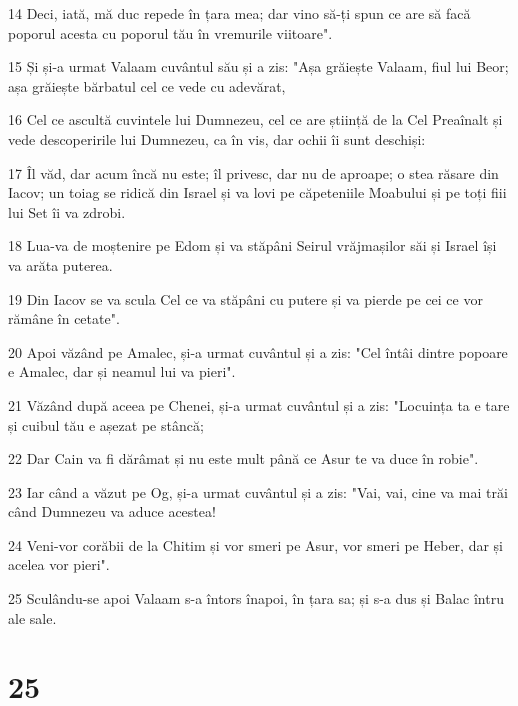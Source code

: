 \par 14 Deci, iată, mă duc repede în țara mea; dar vino să-ți spun ce are să facă poporul acesta cu poporul tău în vremurile viitoare".
\par 15 Și și-a urmat Valaam cuvântul său și a zis: "Așa grăiește Valaam, fiul lui Beor; așa grăiește bărbatul cel ce vede cu adevărat,
\par 16 Cel ce ascultă cuvintele lui Dumnezeu, cel ce are știință de la Cel Preaînalt și vede descoperirile lui Dumnezeu, ca în vis, dar ochii îi sunt deschiși:
\par 17 Îl văd, dar acum încă nu este; îl privesc, dar nu de aproape; o stea răsare din Iacov; un toiag se ridică din Israel și va lovi pe căpeteniile Moabului și pe toți fiii lui Set îi va zdrobi.
\par 18 Lua-va de moștenire pe Edom și va stăpâni Seirul vrăjmașilor săi și Israel își va arăta puterea.
\par 19 Din Iacov se va scula Cel ce va stăpâni cu putere și va pierde pe cei ce vor rămâne în cetate".
\par 20 Apoi văzând pe Amalec, și-a urmat cuvântul și a zis: "Cel întâi dintre popoare e Amalec, dar și neamul lui va pieri".
\par 21 Văzând după aceea pe Chenei, și-a urmat cuvântul și a zis: "Locuința ta e tare și cuibul tău e așezat pe stâncă;
\par 22 Dar Cain va fi dărâmat și nu este mult până ce Asur te va duce în robie".
\par 23 Iar când a văzut pe Og, și-a urmat cuvântul și a zis: "Vai, vai, cine va mai trăi când Dumnezeu va aduce acestea!
\par 24 Veni-vor corăbii de la Chitim și vor smeri pe Asur, vor smeri pe Heber, dar și acelea vor pieri".
\par 25 Sculându-se apoi Valaam s-a întors înapoi, în țara sa; și s-a dus și Balac întru ale sale.

\chapter{25}

